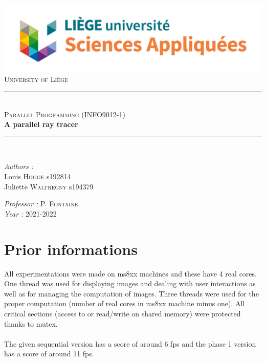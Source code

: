 \documentclass[a4paper, 11pt]{article}
\newcommand{\HRule}{\rule{\linewidth}{0.5mm}}
\begin{document}
\begin{titlepage}

\begin{center}
\includegraphics[scale = 0.35]{logo.jpg}\\
\vspace{1cm}
\textsc{\huge University of Liège}\\[1.2cm]
\HRule \\[1cm]
\textsc{\LARGE Parallel Programming (INFO9012-1) }\\[1cm]
{\Huge \bfseries A parallel ray tracer}\\[1.4cm] 
\HRule \\[1cm]
\end{center}

\begin{minipage}{0.45\linewidth}
      \begin{flushleft} \large
        \emph{Authors : } \\
        Louis \textsc{Hogge}  s192814\\
        Juliette \textsc{Waltregny}  s194379
      \end{flushleft}
\end{minipage}
\hfill
\begin{minipage}{0.45\linewidth}
      \begin{flushright} \large
        \emph{Professor : } P. \textsc{Fontaine}\\
        \emph{Year : } 2021-2022 
      \end{flushright}
\end{minipage}

\end{titlepage}

\newpage

\section{Prior informations}

All experimentations were made on ms8xx machines and these have 4 real cores. One thread was used for displaying images and dealing with user interactions as well as for managing the computation of images. Three threads were used for the proper computation (number of real cores in ms8xx machine minus one). All critical sections (access to or read/write on shared memory) were protected thanks to mutex.
\\
\\
The given sequential version has a score of around 6 fps and the phase 1 version has a score of around 11 fps.
\end{document}
